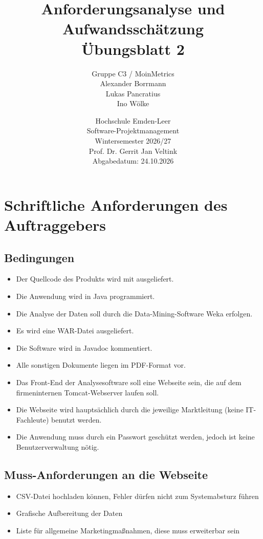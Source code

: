 \documentclass[a4paper,10pt]{article}
\title{Anforderungsanalyse und Aufwandsschätzung\\{\large Übungsblatt 2}}
\author{Gruppe C3 / MoinMetrics\\{}Alexander Borrmann\\{}Lukas Pancratius\\{}Ino Wölke}
\date{Hochschule Emden-Leer\\Software-Projektmanagement\\Wintersemester 2026/27\\Prof. Dr. Gerrit Jan Veltink\\[1em]Abgabedatum: 24.10.2026}
\begin{document}
            \maketitle
        \thispagestyle{fancy}
        \clearpage

        \section*{Schriftliche Anforderungen des Auftraggebers}
\subsection*{Bedingungen}
        \begin{itemize}
            \item Der Quellcode des Produkts wird mit ausgeliefert.
            \item Die Anwendung wird in Java programmiert.
            \item Die Analyse der Daten soll durch die Data-Mining-Software Weka erfolgen.
            \item Es wird eine WAR-Datei ausgeliefert.
            \item Die Software wird in Javadoc kommentiert.
            \item Alle sonstigen Dokumente liegen im PDF-Format vor.
            \item Das Front-End der Analysesoftware soll eine Webseite sein, die auf dem firmeninternen Tomcat-Webserver laufen soll.
            \item Die Webseite wird hauptsächlich durch die jeweilige Marktleitung (keine IT-Fachleute) benutzt werden.
            \item Die Anwendung muss durch ein Passwort geschützt werden, jedoch ist keine Benutzerverwaltung nötig.
        \end{itemize}

        \subsection*{Muss-Anforderungen an die Webseite}
        \begin{itemize}
            \item CSV-Datei hochladen können, Fehler dürfen nicht zum Systemabsturz führen
            \item Grafische Aufbereitung der Daten
            \item Liste für allgemeine Marketingma\ss{}nahmen, diese muss erweiterbar sein
        \end{itemize}
\end{document}
